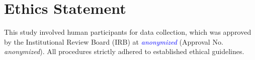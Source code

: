 \documentclass{article}
\newcommand{\alex}[1]{\textcolor{blue}{#1}}%
\begin{document}
\section{Ethics Statement}
This study involved human participants for data collection, which was approved by the Institutional Review Board (IRB) at \alex{\textit{anonymized}} (Approval No. \textit{anonymized}). All procedures strictly adhered to established ethical guidelines.




%
%
%
%
\end{document}
